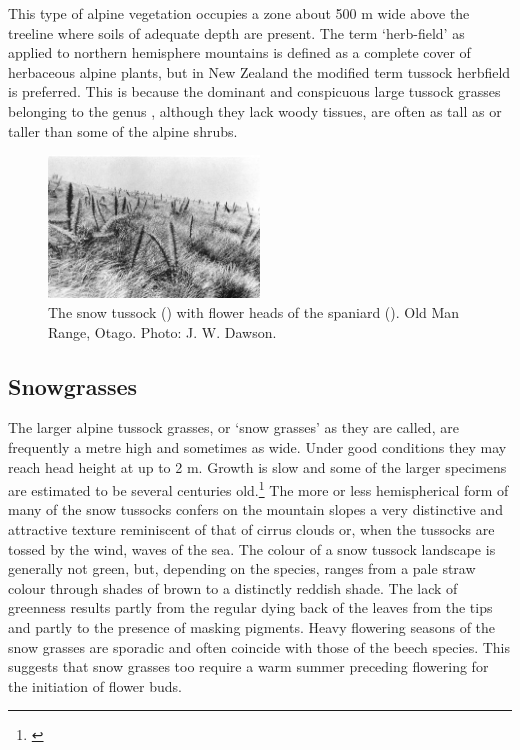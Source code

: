 This type of alpine vegetation occupies a zone about 500 m wide above the treeline where soils of adequate depth are present.
The term `herb-field' as applied to northern hemisphere mountains is defined as a complete cover of herbaceous alpine plants, but in New Zealand the modified term tussock herbfield is preferred.
This is because the dominant and conspicuous large tussock grasses belonging to the genus , although they lack woody tissues, are often as tall as or taller than some of the alpine shrubs.

\begin{figure}
	\includegraphics[width=0.5\textwidth]{graphics/figure96snow-tussock.jpg}
	\centering
	\caption[Snow tussock]{The snow tussock () with flower heads of the spaniard ().
    Old Man Range, Otago.
	Photo: J. W. Dawson.}
	\label{fig:96snow-tussock}
\end{figure}

\subsection{Snowgrasses}

The larger alpine tussock grasses, or `snow grasses' as they are called, are frequently a metre high and sometimes as wide.
Under good conditions they may reach head height at up to 2 m.
Growth is slow and some of the larger specimens are estimated to be several centuries old.\footnote{\cite{mark1974snow}}
The more or less hemispherical form of many of the snow tussocks confers on the mountain slopes a very distinctive and attractive texture reminiscent of that of cirrus clouds or, when the tussocks are tossed by the wind, waves of the sea.
The colour of a snow tussock landscape is generally not green, but, depending on the species, ranges from a pale straw colour through shades of brown to a distinctly reddish shade.
The lack of greenness results partly from the regular dying back of the leaves from the tips and partly to the presence of masking pigments.
Heavy flowering seasons of the snow grasses are sporadic and often coincide with those of the beech species.
This suggests that snow grasses too require a warm summer preceding flowering for the initiation of flower buds.

